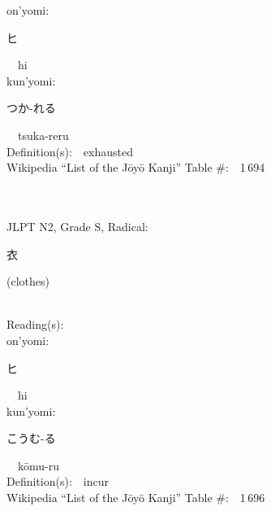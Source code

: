 \begin{multicols}{2}
{\hspace*{1em}}on'yomi:\ \ \\
{\hspace*{2em}}{\begin{CJK}{UTF8}{min} ヒ \end{CJK}}\ \ hi\ \ \\
{\hspace*{1em}}kun'yomi:\ \ \\
{\hspace*{2em}}{\begin{CJK}{UTF8}{min} つか-れる \end{CJK}}\ \ tsuka-reru\ \ \\
Definition(s):\ \ exhausted \\
Wikipedia ``List of the J\=oy\=o Kanji'' Table \#:\ \ 1\,694 \\
\ \ \\
{\fontsize{34pt}{40pt}  }\ \ \\  %
{JLPT N2, Grade S, Radical:\ \ {\begin{CJK}{UTF8}{min} 衣 \end{CJK}} (clothes) } \\
Reading(s):\ \ \\
{\hspace*{1em}}on'yomi:\ \ \\
{\hspace*{2em}}{\begin{CJK}{UTF8}{min} ヒ \end{CJK}}\ \ hi\ \ \\
{\hspace*{1em}}kun'yomi:\ \ \\
{\hspace*{2em}}{\begin{CJK}{UTF8}{min} こうむ-る \end{CJK}}\ \ k\=omu-ru\ \ \\
Definition(s):\ \ incur \\
Wikipedia ``List of the J\=oy\=o Kanji'' Table \#:\ \ 1\,696 \\
\ \ \\
{\fontsize{34pt}{40pt}  }\ \ \\  %

\end{multicols}
